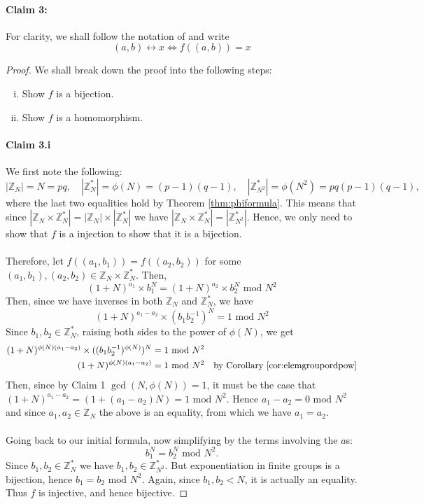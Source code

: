 \documentclass{article}
\theoremstyle{definition}
\newcommand{\Int}{\mathbb{Z}}
\renewcommand{\mod}{\,\,\text{mod}\,\,}
\begin{document}
\paragraph{Claim 3:}
For clarity, we shall follow the notation of \cite{katz2014introduction} and
write
\[
  (a, b) \leftrightarrow x \Leftrightarrow f((a,b)) = x
\]
\begin{proof}
  We shall break down the proof into the following steps:
  \begin{enumerate}[i.]
  \item Show $f$ is a bijection.
  \item Show $f$ is a homomorphism.
  \end{enumerate}
  \paragraph{Claim 3.i} We first note the following:
  \[
    |\Int_{N}| = N = pq,\quad
    |\Int_{N}^*| = \phi(N) = (p - 1)(q - 1),\quad
    |\Int_{N^2}^*| = \phi(N^2) = pq(p - 1)(q - 1),
  \]
  where the last two equalities hold by Theorem \ref{thm:phiformula}.
  This means that since $|\Int_{N} \times \Int_{N}^*| = |\Int_{N}|
  \times |\Int_{N}^*|$ we have $|\Int_{N} \times \Int_{N}^*| = |\Int_{N^2}^*|$.
  Hence, we only need to show that $f$ is a injection to show that it is a bijection.
  \paragraph{}
  Therefore, let $f((a_1, b_1)) = f((a_2, b_2))$ for some $(a_1, b_1), (a_2,
  b_2) \in \Int_{N} \times \Int_{N}^*$. Then,
  \[
    (1 + N)^{a_1}\times b_1^N = (1 + N)^{a_2}\times b_2^N\mod N^2
  \]
  Then, since we have inverses in both $\Int_N$ and $\Int_N^*$, we have
  \[
    (1 + N)^{a_1 - a_2}\times (b_1b_2^{-1})^N = 1 \mod N^2
  \]
  Since $b_1, b_2 \in \Int_N^*$, raising both sides to the power of $\phi(N)$,
  we get
  \begin{align*}
    (1 + N)^{\phi(N)(a_1 - a_2)} \times ((b_1b_2^{-1})^{\phi(N)})^N &= 1 \mod N^2 \\
    (1 + N)^{\phi(N)(a_1 - a_2)}  &= 1 \mod N^2\quad\text{by Corollary \ref{cor:elemgroupordpow}}
  \end{align*}
  Then, since by Claim 1 $\gcd(N, \phi(N)) = 1$, it must be the case that $(1 +
  N)^{a_1 - a_2} = (1 + (a_1 - a_2)N) = 1 \mod N^2$. Hence $a_1 - a_2 = 0 \mod N^2$
  and since $a_1, a_2 \in \Int_N$ the above is an equality, from which we have
  $a_1 = a_2$.
  \paragraph{} Going back to our initial formula, now simplifying by the terms
  involving the $a$s:
  \[
    b_1^N = b_2^N \mod N^2.
  \]
  Since $b_1, b_2 \in \Int_N^*$ we have $b_1, b_2\in \Int_{N^2}^*$. But
  exponentiation in finite groups is a bijection, hence $b_1 = b_2 \mod N^2$.
  Again, since $b_1, b_2 < N$, it is actually an equality. Thus $f$ is
  injective, and hence bijective.

\end{proof}
\end{document}
